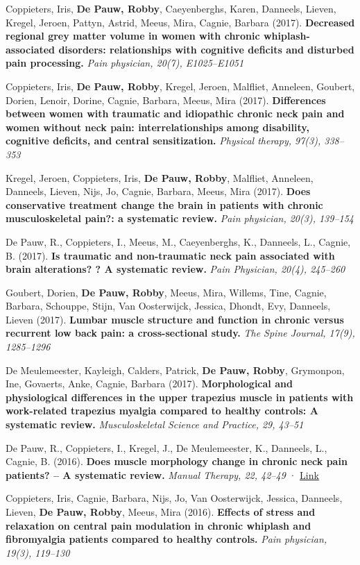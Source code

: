 \documentclass[
  letterpaper,
  DIV=11,
  numbers=noendperiod]{scrartcl}
\begin{document}
Coppieters, Iris, \textbf{De Pauw, Robby}, Caeyenberghs, Karen,
Danneels, Lieven, Kregel, Jeroen, Pattyn, Astrid, Meeus, Mira, Cagnie,
Barbara (2017). \textbf{Decreased regional grey matter volume in women
with chronic whiplash-associated disorders: relationships with cognitive
deficits and disturbed pain processing.} \emph{Pain physician, 20(7),
E1025--E1051}

Coppieters, Iris, \textbf{De Pauw, Robby}, Kregel, Jeroen, Malfliet,
Anneleen, Goubert, Dorien, Lenoir, Dorine, Cagnie, Barbara, Meeus, Mira
(2017). \textbf{Differences between women with traumatic and idiopathic
chronic neck pain and women without neck pain: interrelationships among
disability, cognitive deficits, and central sensitization.}
\emph{Physical therapy, 97(3), 338--353}

Kregel, Jeroen, Coppieters, Iris, \textbf{De Pauw, Robby}, Malfliet,
Anneleen, Danneels, Lieven, Nijs, Jo, Cagnie, Barbara, Meeus, Mira
(2017). \textbf{Does conservative treatment change the brain in patients
with chronic musculoskeletal pain?: a systematic review.} \emph{Pain
physician, 20(3), 139--154}

De Pauw, R., Coppieters, I., Meeus, M., Caeyenberghs, K., Danneels, L.,
Cagnie, B. (2017). \textbf{Is traumatic and non-traumatic neck pain
associated with brain alterations? ? A systematic review.} \emph{Pain
Physician, 20(4), 245--260}

Goubert, Dorien, \textbf{De Pauw, Robby}, Meeus, Mira, Willems, Tine,
Cagnie, Barbara, Schouppe, Stijn, Van Oosterwijck, Jessica, Dhondt, Evy,
Danneels, Lieven (2017). \textbf{Lumbar muscle structure and function in
chronic versus recurrent low back pain: a cross-sectional study.}
\emph{The Spine Journal, 17(9), 1285--1296}

De Meulemeester, Kayleigh, Calders, Patrick, \textbf{De Pauw, Robby},
Grymonpon, Ine, Govaerts, Anke, Cagnie, Barbara (2017).
\textbf{Morphological and physiological differences in the upper
trapezius muscle in patients with work-related trapezius myalgia
compared to healthy controls: A systematic review.}
\emph{Musculoskeletal Science and Practice, 29, 43--51}

De Pauw, R., Coppieters, I., Kregel, J., De Meulemeester, K., Danneels,
L., Cagnie, B. (2016). \textbf{Does muscle morphology change in chronic
neck pain patients? -- A systematic review.} \emph{Manual Therapy, 22,
42--49} · \href{http://dx.doi.org/10.1016/J.MATH.2015.11.006}{Link}

Coppieters, Iris, Cagnie, Barbara, Nijs, Jo, Van Oosterwijck, Jessica,
Danneels, Lieven, \textbf{De Pauw, Robby}, Meeus, Mira (2016).
\textbf{Effects of stress and relaxation on central pain modulation in
chronic whiplash and fibromyalgia patients compared to healthy
controls.} \emph{Pain physician, 19(3), 119--130}
\end{document}
